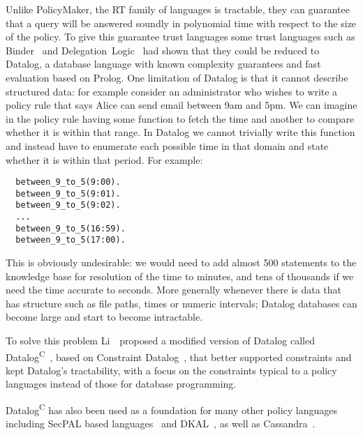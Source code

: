 \documentclass[thesis.tex]{subfiles}
\begin{document}
Unlike PolicyMaker, the RT family of languages is tractable, they can
guarantee that a query will be answered soundly in polynomial time
with respect to the size of the policy.  To give this guarantee trust
languages some trust languages such as
Binder~\cite{detreville_binder_2002} and
Delegation~Logic~\cite{li_delegation_2003,li_practically_2000} had
shown that they could be reduced to Datalog, a database language with
known complexity guarantees and fast evaluation based on Prolog.  One
limitation of Datalog is that it cannot describe structured data: for
example consider an administrator who wishes to write a policy rule
that says Alice can send email between 9am and 5pm.  We can imagine in
the policy rule having some function to fetch the time and another to
compare whether it is within that range.  In Datalog we cannot
trivially write this function and instead have to enumerate each
possible time in that domain and state whether it is within that
period. For example:

\begin{lstlisting}
  between_9_to_5(9:00).
  between_9_to_5(9:01).
  between_9_to_5(9:02).
  ...
  between_9_to_5(16:59).
  between_9_to_5(17:00).
\end{lstlisting}

This is obviously undesirable: we would need to add almost 500
statements to the knowledge base for resolution of the time to
minutes, and tens of thousands if we need the time accurate to
seconds.  More generally whenever there is data that has structure
such as file paths, times or numeric intervals; Datalog databases can
become large and start to become intractable.

To solve this problem Li~\etal{}~proposed a modified version of
Datalog called Datalog\textsuperscript{C}~\cite{li_datalog_2003},
based on Constraint
Datalog~\cite{revesz_constraint_1995,revesz_safe_1998}, that better
supported constraints and kept Datalog's tractability, with a focus on
the constraints typical to a policy languages instead of those for
database programming.

Datalog\textsuperscript{C} has also been used as a foundation for many
other policy languages including SecPAL based
languages~\cite{aziz_secpal4dsa:_2011,becker_secpal:_2010,becker_framework_2009}
and DKAL~\cite{gurevich_dkal:_2008}, as well as
Cassandra~\cite{becker_cassandra:_2004}.
\end{document}
